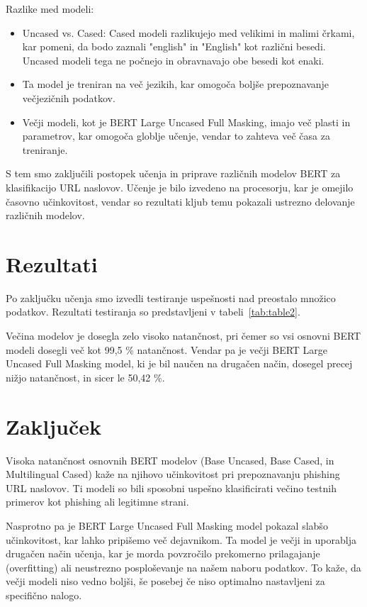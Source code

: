 \documentclass[sigconf,nonacm]{acmart}
\begin{document}
Razlike med modeli:
\begin{itemize}
\item Uncased vs. Cased: Cased modeli razlikujejo med velikimi in malimi črkami, kar pomeni, da bodo zaznali "english" in "English" kot različni besedi. Uncased modeli tega ne počnejo in obravnavajo obe besedi kot enaki.
\item Ta model je treniran na več jezikih, kar omogoča boljše prepoznavanje večjezičnih podatkov.
\item Večji modeli, kot je BERT Large Uncased Full Masking, imajo več plasti in parametrov, kar omogoča globlje učenje, vendar to zahteva več časa za treniranje.
\end{itemize}

S tem smo zaključili postopek učenja in priprave različnih modelov BERT za klasifikacijo URL naslovov. Učenje je bilo izvedeno na procesorju, kar je omejilo časovno učinkovitost, vendar so rezultati kljub temu pokazali ustrezno delovanje različnih modelov.

\section{Rezultati}
Po zaključku učenja smo izvedli testiranje uspešnosti nad preostalo množico podatkov. Rezultati testiranja so predstavljeni v tabeli~\ref{tab:table2}. 

Večina modelov je dosegla zelo visoko natančnost, pri čemer so vsi osnovni BERT modeli dosegli več kot 99,5 \% natančnost. Vendar pa je večji BERT Large Uncased Full Masking model, ki je bil naučen na drugačen način, dosegel precej nižjo natančnost, in sicer le 50,42 \%.

\section{Zaključek}
Visoka natančnost osnovnih BERT modelov (Base Uncased, Base Cased, in Multilingual Cased) kaže na njihovo učinkovitost pri prepoznavanju phishing URL naslovov. Ti modeli so bili sposobni uspešno klasificirati večino testnih primerov kot phishing ali legitimne strani.

Nasprotno pa je BERT Large Uncased Full Masking model pokazal slabšo učinkovitost, kar lahko pripišemo več dejavnikom. Ta model je večji in uporablja drugačen način učenja, kar je morda povzročilo prekomerno prilagajanje (overfitting) ali neustrezno posploševanje na našem naboru podatkov. To kaže, da večji modeli niso vedno boljši, še posebej če niso optimalno nastavljeni za specifično nalogo.
\end{document}
